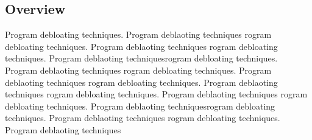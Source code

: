 \documentclass{relatorio}
\begin{document}
\subsection{Overview}%
\label{Tools}

Program debloating techniques. Program deblaoting techniques rogram debloating techniques. Program deblaoting techniques
rogram debloating techniques. Program deblaoting techniquesrogram debloating techniques. Program deblaoting techniques
rogram debloating techniques. Program deblaoting techniques rogram debloating techniques. Program deblaoting techniques
rogram debloating techniques. Program deblaoting techniques 
rogram debloating techniques. Program deblaoting techniquesrogram debloating techniques. Program deblaoting techniques
rogram debloating techniques. Program deblaoting techniques
\end{document}
